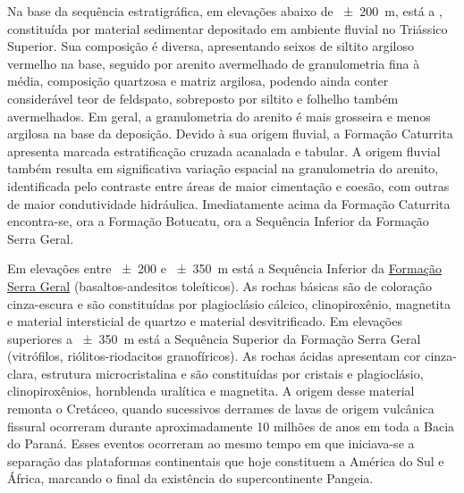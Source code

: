 Na base da sequência estratigráfica, em elevações abaixo de \SI{\pm200}{\metre}, está a \caturrita{}, 
constituída por material sedimentar depositado em ambiente fluvial no Triássico Superior. Sua composição é 
diversa, apresentando seixos de siltito argiloso vermelho na base, seguido por arenito avermelhado de 
granulometria fina à média, composição quartzosa e matriz argilosa, podendo ainda conter considerável teor de 
feldspato, sobreposto por siltito e folhelho também avermelhados. Em geral, a granulometria do arenito é mais 
grosseira e menos argilosa na base da deposição. Devido à sua origem fluvial, a Formação Caturrita apresenta 
marcada estratificação cruzada acanalada e tabular. A origem fluvial também resulta em significativa variação 
espacial na granulometria do arenito, identificada pelo contraste entre áreas de maior cimentação e coesão, 
com 
outras de maior condutividade hidráulica. Imediatamente acima da Formação Caturrita encontra-se, ora a 
Formação Botucatu, ora a Sequência Inferior da Formação Serra Geral.


\def\serrageral{\href{http://pt.wikipedia.org/wiki/Forma\%C3\%A7\%C3\%A3o_Serra_Geral}{Formação Serra Geral}}

Em elevações entre \num{\pm200} e \SI{\pm350}{\metre} está a Sequência Inferior da \serrageral{} 
(basaltos-andesitos toleíticos). As rochas básicas são de coloração cinza-escura e são constituídas por 
plagioclásio cálcico, clinopiroxênio, magnetita e material intersticial de quartzo e material desvitrificado. 
Em elevações superiores a \SI{\pm350}{\metre} está a Sequência Superior da Formação Serra Geral (vitrófilos, 
riólitos-riodacitos granofíricos). As rochas ácidas apresentam cor cinza-clara, estrutura microcristalina e 
são constituídas por cristais e plagioclásio, clinopiroxênios, hornblenda uralítica e magnetita. A origem 
desse material remonta o Cretáceo, quando sucessivos derrames de lavas de origem vulcânica fissural ocorreram 
durante aproximadamente \num{10} milhões de anos em toda a Bacia do Paraná. Esses eventos ocorreram ao mesmo 
tempo em que iniciava-se a separação das plataformas continentais que hoje constituem a América do Sul e 
África, 
marcando o final da existência do supercontinente Pangeia.

